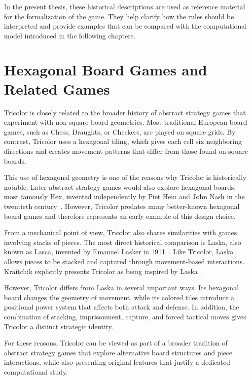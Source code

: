 In the present thesis, these historical descriptions are used as reference material for the formalization of the game. They help clarify how the rules should be interpreted and provide examples that can be compared with the computational model introduced in the following chapters.

\section{Hexagonal Board Games and Related Games}

Tricolor is closely related to the broader history of abstract strategy games that experiment with non-square board geometries. Most traditional European board games, such as Chess, Draughts, or Checkers, are played on square grids. By contrast, Tricolor uses a hexagonal tiling, which gives each cell six neighboring directions and creates movement patterns that differ from those found on square boards.

This use of hexagonal geometry is one of the reasons why Tricolor is historically notable. Later abstract strategy games would also explore hexagonal boards, most famously Hex, invented independently by Piet Hein and John Nash in the twentieth century~\cite{hayward2006hex}. However, Tricolor predates many better-known hexagonal board games and therefore represents an early example of this design choice.

From a mechanical point of view, Tricolor also shares similarities with games involving stacks of pieces. The most direct historical comparison is Laska, also known as Lasca, invented by Emanuel Lasker in 1911~\cite{hirthrougetet_sphinx}. Like Tricolor, Laska allows pieces to be stacked and captured through movement-based interactions. Kraitchik explicitly presents Tricolor as being inspired by Laska~\cite{kraitchik1930tricolor}.

However, Tricolor differs from Laska in several important ways. Its hexagonal board changes the geometry of movement, while its colored tiles introduce a positional power system that affects both attack and defense. In addition, the combination of stacking, imprisonment, capture, and forced tactical moves gives Tricolor a distinct strategic identity.

For these reasons, Tricolor can be viewed as part of a broader tradition of abstract strategy games that explore alternative board structures and piece interactions, while also presenting original features that justify a dedicated computational study.

